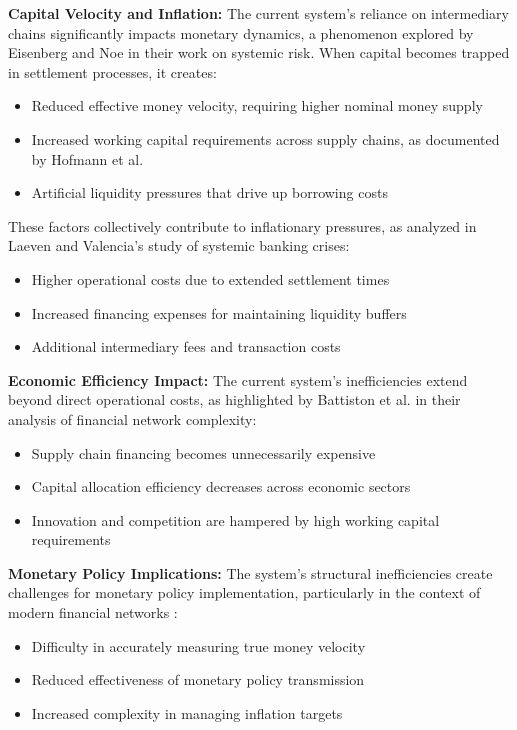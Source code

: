 \documentclass[twocolumn,10pt,a4paper]{article}
\begin{document}
\textbf{Capital Velocity and Inflation:}
The current system's reliance on intermediary chains significantly impacts monetary dynamics, a phenomenon explored by Eisenberg and Noe \cite{eisenberg2001systemic} in their work on systemic risk. When capital becomes trapped in settlement processes, it creates:
\begin{itemize}
    \item Reduced effective money velocity, requiring higher nominal money supply
    \item Increased working capital requirements across supply chains, as documented by Hofmann et al. \cite{hofmann2017supply}
    \item Artificial liquidity pressures that drive up borrowing costs
\end{itemize}

These factors collectively contribute to inflationary pressures, as analyzed in Laeven and Valencia's study \cite{laeven2018systemic} of systemic banking crises:
\begin{itemize}
    \item Higher operational costs due to extended settlement times
    \item Increased financing expenses for maintaining liquidity buffers
    \item Additional intermediary fees and transaction costs
\end{itemize}

\textbf{Economic Efficiency Impact:}
The current system's inefficiencies extend beyond direct operational costs, as highlighted by Battiston et al. \cite{battiston2016complexity} in their analysis of financial network complexity:
\begin{itemize}
    \item Supply chain financing becomes unnecessarily expensive
    \item Capital allocation efficiency decreases across economic sectors
    \item Innovation and competition are hampered by high working capital requirements
\end{itemize}

\textbf{Monetary Policy Implications:}
The system's structural inefficiencies create challenges for monetary policy implementation, particularly in the context of modern financial networks \cite{eisenberg2001systemic}:
\begin{itemize}
    \item Difficulty in accurately measuring true money velocity
    \item Reduced effectiveness of monetary policy transmission
    \item Increased complexity in managing inflation targets
\end{itemize}
\end{document}
